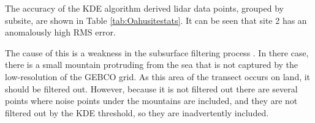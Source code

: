 The accuracy of the KDE algorithm derived lidar data points, grouped by subsite, are shown in Table \ref{tab:Oahusitestats}. It can be seen that site 2 has an anomalously high RMS error. 


\begin{figure}
    \begin{floatrow}
    \end{floatrow}
\end{figure}


The cause of this is a weakness in the subsurface filtering process . In there case, there is a small mountain protruding from the sea that is not captured by the low-resolution of the GEBCO grid. As this area of the transect occurs on land, it should be filtered out. However, because it is not filtered out there are several points where noise points under the mountains are included, and they are not filtered out by the KDE threshold, so they are inadvertently included. 

